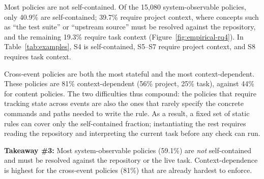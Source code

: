 Most policies are not self-contained. Of the 15{,}080 system-observable policies, only 40.9\% are self-contained; 39.7\% require project context, where concepts such as ``the test suite'' or ``upstream source'' must be resolved against the repository, and the remaining 19.3\% require task context (Figure~\ref{fig:empirical-rq4}). In Table~\ref{tab:examples}, S4 is self-contained, S5--S7 require project context, and S8 requires task context.

Cross-event policies are both the most stateful and the most context-dependent. These policies are 81\% context-dependent (56\% project, 25\% task), against 44\% for content policies. The two difficulties thus compound: the policies that require tracking state across events are also the ones that rarely specify the concrete commands and paths needed to write the rule. As a result, a fixed set of static rules can cover only the self-contained fraction; instantiating the rest requires reading the repository and interpreting the current task before any check can run.

\begin{tcolorbox}[colback=blue!5!white,colframe=gray!75!black,left=1mm, right=1mm, top=0.5mm, bottom=0.5mm, arc=1mm]
\textbf{Takeaway \#3:} Most system-observable policies (59.1\%) are \emph{not} self-contained and must be resolved against the repository or the live task. Context-dependence is highest for the cross-event policies (81\%) that are already hardest to enforce.
\end{tcolorbox}

